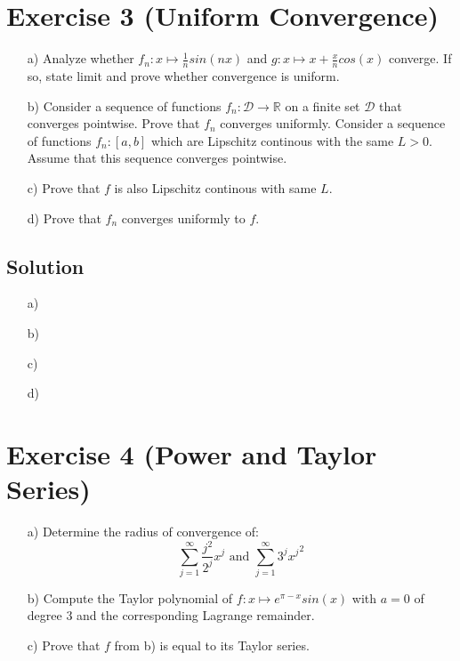 \documentclass[10pt]{article}
\numberwithin{equation}{section}
\begin{document}
\section*{Exercise 3 (Uniform Convergence)}
\begin{enumerate}
\item[a)]{
    Analyze whether $f_n: x\mapsto \frac{1}{n}sin(nx)$ and $g: x \mapsto x + \frac{x}{n}cos(x)$ converge. If so, state limit and prove whether convergence is uniform.
  }
\item[b)]{
    Consider a sequence of functions $f_n: \mathcal{D} \rightarrow \mathbb{R}$ on a finite set $\mathcal{D}$ that converges pointwise. Prove that $f_n$ converges uniformly.
  }
Consider a sequence of functions $f_n: [a,b]$ which are Lipschitz continous with the same $L > 0$. Assume that this sequence converges pointwise.
\item[c)]{
    Prove that $f$ is also Lipschitz continous with same $L$.
  }
\item[d)]{
    Prove that $f_n$ converges uniformly to $f$.
  }
\end{enumerate}


\subsection*{Solution}
\begin{enumerate}
\item[a)]{
  }
\item[b)]{
  }
\item[c)]{
  }
\item[d)]{
  }
\end{enumerate}

\section*{Exercise 4 (Power and Taylor Series)}


\begin{enumerate}
\item[a)]{
    Determine the radius of convergence of:
    $$\sum_{j=1}^{\infty} \frac{j^2}{2^j}x^j \text{ and }\sum_{j=1}^{\infty} 3^j {x^j}^2$$
  }
\item[b)]{
    Compute the Taylor polynomial of $f: x \mapsto e^{\pi -x} sin(x)$ with $a=0$ of degree $3$ and the corresponding Lagrange remainder.
  }
\item[c)]{
    Prove that $f$ from b) is equal to its Taylor series.
  }
\end{enumerate}
\end{document}
